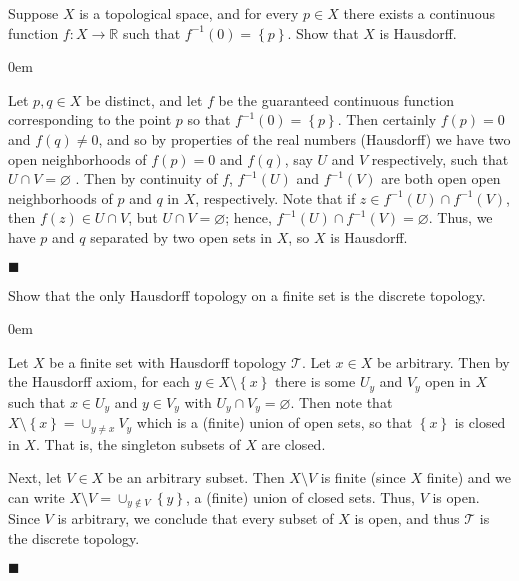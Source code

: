 \documentclass[12pt]{article}
\renewcommand{\qed}{\hfill$\blacksquare$}
\renewenvironment{proof}{\begin{addmargin}[1em]{0em}\begin{newproof}}{\end{newproof}\end{addmargin}\qed}
\newenvironment{exercise}[2][Exercise]{\begin{trivlist}
\item[\hskip \labelsep {\bfseries #1}\hskip \labelsep {\bfseries #2.}]}{\end{trivlist}}
\begin{document}
\begin{exercise}{2.35}
	Suppose $X$ is a topological space, and for every $p\in X$ there exists a continuous function $f:X\rightarrow \mathbb{R}$ such that $f^{-1}\left(0\right)=\left\{p\right\}$. Show that $X$ is Hausdorff.
\end{exercise}
\begin{proof}
Let $p,q\in X$ be distinct, and let $f$ be the guaranteed continuous function corresponding to the point $p$ so that $f^{-1}\left(0\right)=\left\{p\right\}$. Then certainly $f\left(p\right)=0$ and $f\left(q\right)\neq 0$, and so by properties of the real numbers (Hausdorff) we have two open neighborhoods of $f\left(p\right)=0$ and $f\left(q\right)$, say $U$ and $V$ respectively, such that $U\cap V = \varnothing $ . Then by continuity of $f$, $f^{-1}\left(U\right)$ and $f^{-1}\left(V\right)$ are both open open neighborhoods of $p$ and $q$ in $X$, respectively. Note that if $z \in f^{-1}\left(U\right)\cap f^{-1}\left(V\right)$, then $f\left(z\right)\in U\cap V$, but $U\cap V = \varnothing $; hence, $f^{-1}\left(U\right)\cap f^{-1}\left(V\right) = \varnothing $. Thus, we have $p$ and $q$ separated by two open sets in $X$, so $X$ is Hausdorff.
\end{proof}








\begin{exercise}{2.38}
	Show that the only Hausdorff topology on a finite set is the discrete topology.
\end{exercise}
\begin{proof}
Let $X$ be a finite set with Hausdorff topology $\mathcal{T}$. Let $x\in X$ be arbitrary. Then by the Hausdorff axiom, for each $y\in X\setminus\left\{x\right\}$ there is some $U_y$ and $V_y$ open in $X$ such that $x\in U_y$ and $y\in V_y$ with $U_y \cap V_y =\varnothing $. Then note that $X\setminus \left\{x\right\} = \cup_{y \neq x} V_y $ which is a (finite) union of open sets, so that $\left\{x\right\}$ is closed in $X$. That is, the singleton subsets of $X$ are closed.

Next, let $V\in X$ be an arbitrary subset. Then $X\setminus V$ is finite (since $X$ finite) and we can write $X\setminus V = \cup_{y\notin V} \left\{y\right\}$, a (finite) union of closed sets. Thus, $V$ is open. Since $V$ is arbitrary, we conclude that every subset of $X$ is open, and thus $\mathcal{T}$ is the discrete topology.
\end{proof}
\end{document}
